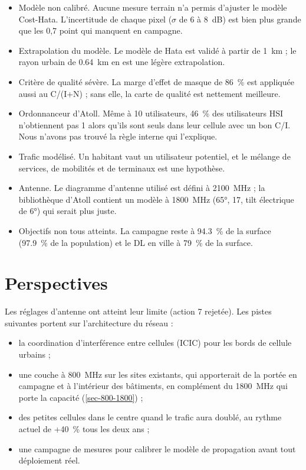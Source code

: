 \begin{itemize}
  \item Modèle non calibré. Aucune mesure terrain n'a permis d'ajuster le modèle Cost-Hata. L'incertitude de chaque pixel ($\sigma$ de 6 à \SI{8}{\deci\bel}) est bien plus grande que les 0,7 point qui manquent en campagne.
  \item Extrapolation du modèle. Le modèle de Hata est validé à partir de \SI{1}{\kilo\metre} ; le rayon urbain de \SI{0,64}{\kilo\metre} en est une légère extrapolation.
  \item Critère de qualité sévère. La marge d'effet de masque de \SI{86}{\percent} est appliquée aussi au C/(I+N) ; sans elle, la carte de qualité est nettement meilleure.
  \item Ordonnanceur d'Atoll. Même à 10 utilisateurs, \SI{46}{\percent} des utilisateurs HSI n'obtiennent pas \SI{1}{\Mbps} alors qu'ils sont seuls dans leur cellule avec un bon C/I. Nous n'avons pas trouvé la règle interne qui l'explique.
  \item Trafic modélisé. Un habitant vaut un utilisateur potentiel, et le mélange de services, de mobilités et de terminaux est une hypothèse.
  \item Antenne. Le diagramme d'antenne utilisé est défini à \SI{2100}{\mega\hertz} ; la bibliothèque d'Atoll contient un modèle à \SI{1800}{\mega\hertz} (\ang{65}, \SI{17}{\dBi}, tilt électrique de \ang{6}) qui serait plus juste.
  \item Objectifs non tous atteints. La campagne reste à \SI{94,3}{\percent} de la surface (\SI{97,9}{\percent} de la population) et le DL en ville à \SI{79}{\percent} de la surface.
\end{itemize}

\section{Perspectives}

Les réglages d'antenne ont atteint leur limite (action 7 rejetée). Les pistes suivantes portent sur l'architecture du réseau :
\begin{itemize}
  \item la coordination d'interférence entre cellules (ICIC) pour les bords de cellule urbains ;
  \item une couche à \SI{800}{\mega\hertz} sur les sites existants, qui apporterait de la portée en campagne et à l'intérieur des bâtiments, en complément du \SI{1800}{\mega\hertz} qui porte la capacité (\cref{sec-800-1800}) ;
  \item des petites cellules dans le centre quand le trafic aura doublé, au rythme actuel de +\SI{40}{\percent} tous les deux ans ;
  \item une campagne de mesures pour calibrer le modèle de propagation avant tout déploiement réel.
\end{itemize}
